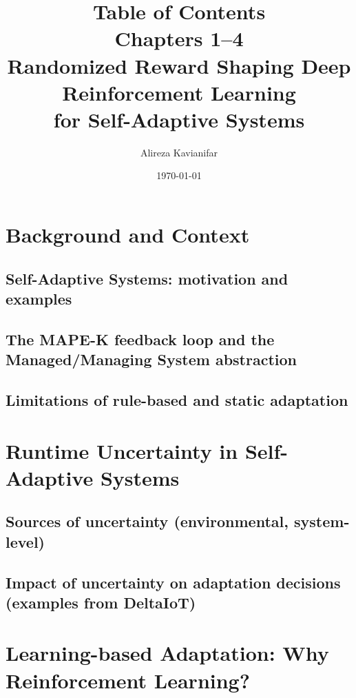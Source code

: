 \documentclass[11pt,a4paper]{article}
\title{Table of Contents\\Chapters 1--4\\[0.3cm]\small{Randomized Reward Shaping Deep Reinforcement Learning\\for Self-Adaptive Systems}}
\author{Alireza Kavianifar}
\date{\today}
\begin{document}
\maketitle

\tableofcontents
\newpage


\setcounter{section}{0}
\renewcommand{\thesection}{1.\arabic{section}}
\renewcommand{\thesubsection}{1.\arabic{section}.\arabic{subsection}}
\renewcommand{\thesubsubsection}{1.\arabic{section}.\arabic{subsection}.\arabic{subsubsection}}

\section{Background and Context}
\subsection{Self-Adaptive Systems: motivation and examples}
\subsection{The MAPE-K feedback loop and the Managed/Managing System abstraction}
\subsection{Limitations of rule-based and static adaptation}

\section{Runtime Uncertainty in Self-Adaptive Systems}
\subsection{Sources of uncertainty (environmental, system-level)}
\subsection{Impact of uncertainty on adaptation decisions (examples from DeltaIoT)}

\section{Learning-based Adaptation: Why Reinforcement Learning?}
\end{document}
